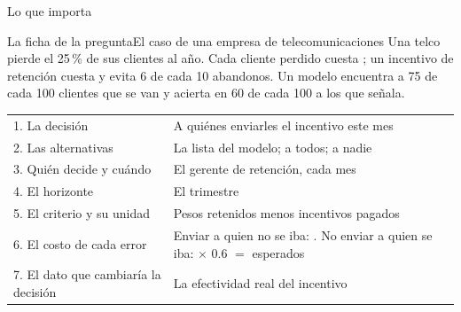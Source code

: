 \documentclass{beamer}
\begin{document}
\begin{frame}{Lo que importa}
\end{frame}

\begin{frame}{La ficha de la pregunta}{El caso de una empresa de telecomunicaciones}
\footnotesize
Una telco pierde el 25\,\% de sus clientes al año. Cada cliente perdido cuesta ; un incentivo de retención cuesta  y evita 6 de cada 10 abandonos. Un modelo encuentra a 75 de cada 100 clientes que se van y acierta en 60 de cada 100 a los que señala.
\smallskip
\begin{tabular}{@{}p{}p{}@{}}
\toprule
1. La decisión & A quiénes enviarles el incentivo este mes \\
2. Las alternativas & La lista del modelo; a todos; a nadie \\
3. Quién decide y cuándo & El gerente de retención, cada mes \\
4. El horizonte & El trimestre \\
5. El criterio y su unidad & Pesos retenidos menos incentivos pagados \\
6. El costo de cada error & Enviar a quien no se iba: \peso100. No enviar a quien se iba: \peso500 $\times$ 0.6 $=$ \peso300 esperados \\
7. El dato que cambiaría la decisión & La efectividad real del incentivo \\
\bottomrule
\end{tabular}
\end{frame}
\end{document}
